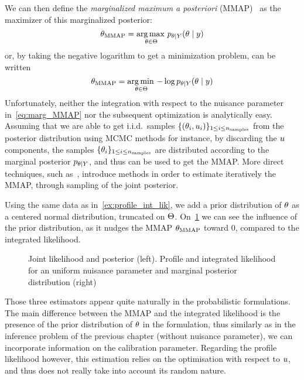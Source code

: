 \documentclass[../../Main_ManuscritThese.tex]{subfiles}
\newcommand\imgpath{/home/victor/acadwriting/Manuscrit/Text/Chapter3/img/}
\begin{document}
We can then define the \emph{marginalized maximum a posteriori} (MMAP)~\cite{doucet_marginal_2002} as the  maximizer of this marginalized posterior:
\begin{equation}
  \label{eq:def_MMAP}
  {\theta}_{\mathrm{MMAP}} = \operatorname*{arg\,max \,}_{\theta\in\Theta} p_{\theta \mid Y}(\theta\mid y)
\end{equation}
or, by taking the negative logarithm to get a minimization problem, can be written
\begin{equation}
{\theta}_{\mathrm{MMAP}} = \operatorname*{arg\,min \,}_{\theta\in\Theta} -\log  p_{\theta\mid Y}(\theta\mid y)
\end{equation}
Unfortunately, neither the integration with respect to the nuisance parameter in~\eqref{eq:marg_MMAP} nor the subsequent optimization is analytically easy.
Assuming that we are able to get i.i.d.\ samples $\{(\theta_i, u_i)\}_{1\leq i \leq n_{\mathrm{samples}}}$ from the posterior distribution using MCMC methods for instance, by discarding the $u$ components, the samples $\{\theta_i\}_{1 \leq i\leq n_{\mathrm{samples}}}$ are distributed according to the marginal posterior $p_{\theta \mid Y}$, and thus can be used to get the MMAP. More direct techniques, such as~\cite{doucet_marginal_2002}, introduce methods in order to estimate iteratively the MMAP, through sampling of the joint posterior.
\begin{example}
  Using the same data as in~\cref{ex:profile_int_lik}, we add a prior distribution of $\theta$ as a centered normal distribution, truncated on $\Theta$. On~\cref{fig:profile_integrated_lik} we can see the influence of the prior distribution, as it nudges the MMAP ${\theta}_{\mathrm{MMAP}}$ toward $0$, compared to the integrated likelihood.
\end{example}
\begin{figure}[ht]
  \centering
  
  \caption[Joint likelihood and posterior distribution]{\label{fig:profile_integrated_lik} Joint likelihood and posterior (left). Profile and integrated likelihood for an uniform nuisance parameter and marginal posterior distribution (right)}
\end{figure}
Those three estimators appear quite naturally in the probabilistic
formulations. The main difference between the MMAP and the integrated
likelihood is the presence of the prior distribution of $\theta$ in the
formulation, thus similarly as in the inference problem of the
previous chapter (without nuisance parameter), we can incorporate
information on the calibration parameter. Regarding the profile
likelihood however, this estimation relies on the optimisation with
respect to $u$, and thus does not really take into account its
random nature.
\end{document}
